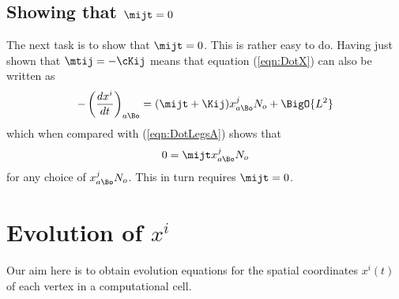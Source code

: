 \documentclass[a4paper,12pt]{article}
\numberwithin{equation}{section}
\begin{document}
\subsection*{Showing that $\mijt = 0$}

The next task is to show that $\mijt=0$. This is rather easy to do. Having just shown that
$\mtij = -\cKij$ means that equation (\ref{eqn:DotX}) can also be written as
\begin{align}
   -\left(\frac{dx^i}{dt}\right)_{a\Bo}
      = (\mijt+\Kij) x^j_{a\Bo} N_o
      + \BigO{L^2}
\end{align}
which when compared with (\ref{eqn:DotLegsA}) shows that
\begin{align}
   0 = \mijt x^j_{a\Bo} N_o
\end{align}
for any choice of $x^j_{a\Bo} N_o$. This in turn requires $\mijt=0$.

\section{Evolution of $x^i$}
\label{sec:EvolveRNC}

Our aim here is to obtain evolution equations for the spatial coordinates $x^i(t)$ of
each vertex in a computational cell.
\end{document}
